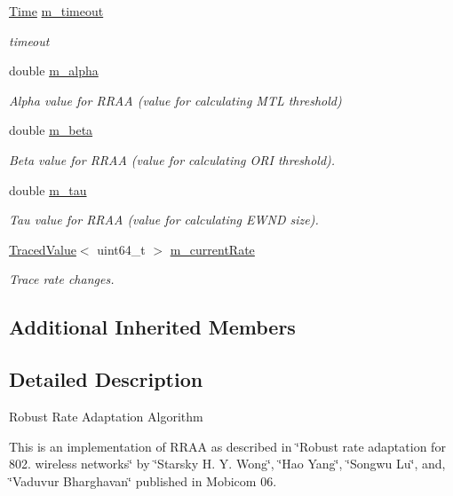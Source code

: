 \begin{DoxyCompactItemize}
\hyperlink{classns3_1_1Time}{Time} \hyperlink{classns3_1_1RraaWifiManager_aded5168ef9f21eea5a9da48dedb99a7c}{m\+\_\+timeout}
\begin{DoxyCompactList}\small\item\em timeout \end{DoxyCompactList}\item 
double \hyperlink{classns3_1_1RraaWifiManager_ae374e30da98153008fe7ab5e5c4fc841}{m\+\_\+alpha}
\begin{DoxyCompactList}\small\item\em Alpha value for R\+R\+AA (value for calculating M\+TL threshold) \end{DoxyCompactList}\item 
double \hyperlink{classns3_1_1RraaWifiManager_aa17d371f547614b74583c5a841506b20}{m\+\_\+beta}
\begin{DoxyCompactList}\small\item\em Beta value for R\+R\+AA (value for calculating O\+RI threshold). \end{DoxyCompactList}\item 
double \hyperlink{classns3_1_1RraaWifiManager_a0d9f0026dd2c7454fa346795bb1e0ea0}{m\+\_\+tau}
\begin{DoxyCompactList}\small\item\em Tau value for R\+R\+AA (value for calculating E\+W\+ND size). \end{DoxyCompactList}\item 
\hyperlink{classns3_1_1TracedValue}{Traced\+Value}$<$ uint64\+\_\+t $>$ \hyperlink{classns3_1_1RraaWifiManager_a22d99170f7a381dd9f27716d9215dd92}{m\+\_\+current\+Rate}
\begin{DoxyCompactList}\small\item\em Trace rate changes. \end{DoxyCompactList}\end{DoxyCompactItemize}
\subsection*{Additional Inherited Members}


\subsection{Detailed Description}
Robust Rate Adaptation Algorithm

This is an implementation of R\+R\+AA as described in \char`\"{}\+Robust rate adaptation for 802. wireless networks\char`\"{} by \char`\"{}\+Starsky H. Y. Wong\char`\"{}, \char`\"{}\+Hao Yang\char`\"{}, \char`\"{}\+Songwu Lu\char`\"{}, and, \char`\"{}\+Vaduvur Bharghavan\char`\"{} published in Mobicom 06. 

